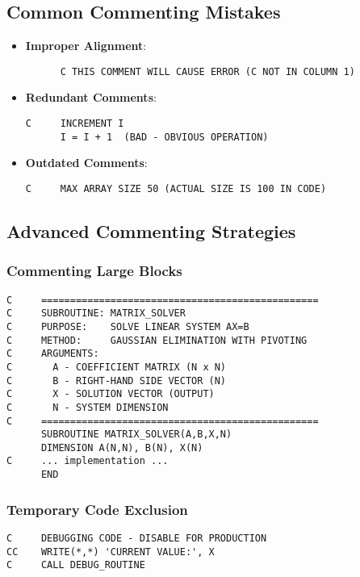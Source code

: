 \documentclass{book}
\begin{document}
\subsection*{Common Commenting Mistakes}
\begin{itemize}
    \item \textbf{Improper Alignment}:
    \begin{verbatim}
      C THIS COMMENT WILL CAUSE ERROR (C NOT IN COLUMN 1)
    \end{verbatim}
    
    \item \textbf{Redundant Comments}:
    \begin{verbatim}
C     INCREMENT I
      I = I + 1  (BAD - OBVIOUS OPERATION)
    \end{verbatim}
    
    \item \textbf{Outdated Comments}:
    \begin{verbatim}
C     MAX ARRAY SIZE 50 (ACTUAL SIZE IS 100 IN CODE)
    \end{verbatim}
\end{itemize}

\subsection*{Advanced Commenting Strategies}

\subsubsection*{Commenting Large Blocks}
\begin{verbatim}
C     ================================================
C     SUBROUTINE: MATRIX_SOLVER
C     PURPOSE:    SOLVE LINEAR SYSTEM AX=B
C     METHOD:     GAUSSIAN ELIMINATION WITH PIVOTING
C     ARGUMENTS:
C       A - COEFFICIENT MATRIX (N x N)
C       B - RIGHT-HAND SIDE VECTOR (N)
C       X - SOLUTION VECTOR (OUTPUT)
C       N - SYSTEM DIMENSION
C     ================================================
      SUBROUTINE MATRIX_SOLVER(A,B,X,N)
      DIMENSION A(N,N), B(N), X(N)
C     ... implementation ...
      END
\end{verbatim}

\subsubsection*{Temporary Code Exclusion}
\begin{verbatim}
C     DEBUGGING CODE - DISABLE FOR PRODUCTION
CC    WRITE(*,*) 'CURRENT VALUE:', X
C     CALL DEBUG_ROUTINE
\end{verbatim}
\end{document}
